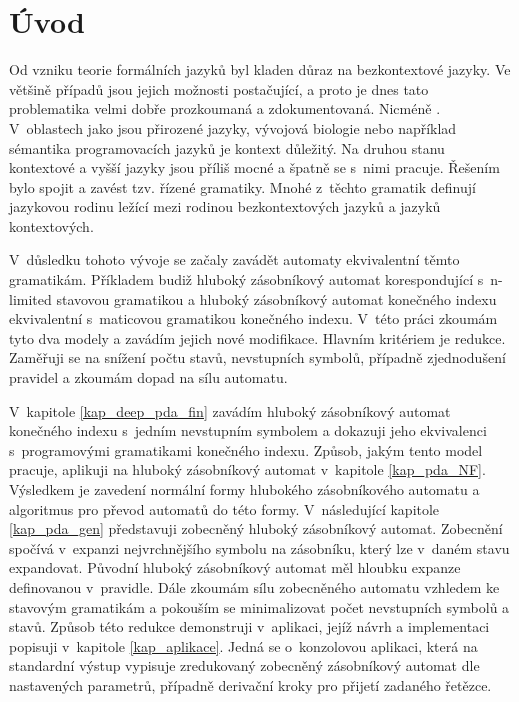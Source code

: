 
\chapter{Úvod}

Od vzniku teorie formálních jazyků byl kladen důraz na bezkontextové jazyky. Ve většině případů jsou jejich možnosti postačující, a proto je dnes tato problematika velmi dobře prozkoumaná a zdokumentovaná. Nicméně  \cite{Dassow:RegulatedRewriting}. V~oblastech jako jsou přirozené jazyky, vývojová biologie nebo například sémantika programovacích jazyků je kontext důležitý. Na druhou stanu kontextové a vyšší jazyky jsou příliš mocné a špatně se s~nimi pracuje. Řešením bylo spojit  \cite{Dassow:RegulatedRewriting} a zavést tzv. řízené gramatiky. Mnohé z~těchto gramatik definují jazykovou rodinu ležící mezi rodinou bezkontextových jazyků a jazyků kontextových.

V~důsledku tohoto vývoje se začaly zavádět automaty ekvivalentní těmto gramatikám. Příkladem budiž hluboký zásobníkový automat \cite{Meduna:DeepPDA} korespondující s~n-limited stavovou gramatikou a hluboký zásobníkový automat konečného indexu \cite{Meduna:FinitelyDeepPDA} ekvivalentní s~maticovou gramatikou konečného indexu. V~této práci zkoumám tyto dva modely a zavádím jejich nové modifikace. Hlavním kritériem je redukce. Zaměřuji se na snížení počtu stavů, nevstupních symbolů, případně zjednodušení pravidel a zkoumám dopad na sílu automatu.


V~kapitole \ref{kap_deep_pda_fin} zavádím hluboký zásobníkový automat konečného indexu s~jedním nevstupním symbolem a dokazuji jeho ekvivalenci s~programovými gramatikami konečného indexu. Způsob, jakým tento model pracuje, aplikuji na hluboký zásobníkový automat v~kapitole \ref{kap_pda_NF}. Výsledkem je zavedení normální formy hlubokého zásobníkového automatu a algoritmus pro převod automatů do této formy. V~následující kapitole \ref{kap_pda_gen} představuji zobecněný hluboký zásobníkový automat. Zobecnění spočívá v~expanzi nejvrchnějšího symbolu na zásobníku, který lze v~daném stavu expandovat. Původní hluboký zásobníkový automat měl hloubku expanze definovanou v~pravidle. Dále zkoumám sílu zobecněného automatu vzhledem ke stavovým gramatikám a pokouším se minimalizovat počet nevstupních symbolů a stavů. Způsob této redukce demonstruji v~aplikaci, jejíž návrh a implementaci popisuji v~kapitole \ref{kap_aplikace}. Jedná se o~konzolovou aplikaci, která na standardní výstup vypisuje zredukovaný zobecněný zásobníkový automat dle nastavených parametrů, případně derivační kroky pro přijetí zadaného řetězce.


